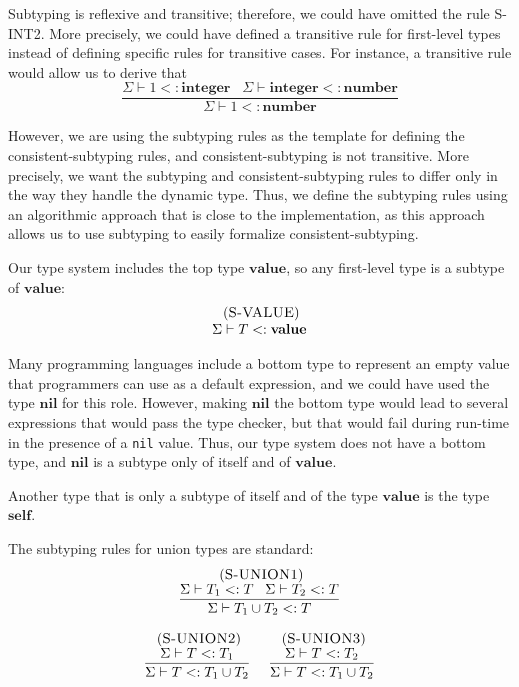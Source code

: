 \documentclass{sigplanconf}
\newcommand{\Value}{\mathbf{value}}
\newcommand{\Nil}{\mathbf{nil}}
\newcommand{\Self}{\mathbf{self}}
\newcommand{\Integer}{\mathbf{integer}}
\newcommand{\Number}{\mathbf{number}}
\newcommand{\mylabel}[1]{\; (\textsc{#1})}
\newcommand{\senv}{\Sigma}
\newcommand{\subtype}{<:}
\begin{document}
Subtyping is reflexive and transitive;
therefore, we could have omitted the rule \textsc{S-INT2}.
More precisely, we could have defined a transitive rule for first-level
types instead of defining specific rules for transitive cases.
For instance, a transitive rule would allow us to derive that
\[
\dfrac{\senv \vdash 1 \subtype \Integer \;\;\;
       \senv \vdash \Integer \subtype \Number}
      {\senv \vdash 1 \subtype \Number}
\]

However, we are using the subtyping rules as the template for defining
the consistent-subtyping rules, and consistent-subtyping is not
transitive.
More precisely, we want the subtyping and consistent-subtyping rules
to differ only in the way they handle the dynamic type.
Thus, we define the subtyping rules using an algorithmic approach
that is close to the implementation, as this approach allows us to use
subtyping to easily formalize consistent-subtyping.

Our type system includes the top type $\Value$,
so any first-level type is a subtype of $\Value$:
\[
\begin{array}{c}
\mylabel{S-VALUE}\\
\senv \vdash T \subtype \Value
\end{array}
\]

Many programming languages include a bottom type to represent
an empty value that programmers can use as a default expression,
and we could have used the type $\Nil$ for this role.
However, making $\Nil$ the bottom type would lead to several expressions
that would pass the type checker, but that would fail during run-time
in the presence of a \texttt{nil} value.
Thus, our type system does not have a bottom type, and $\Nil$ is a
subtype only of itself and of $\Value$.

Another type that is only a subtype of itself and of the type $\Value$
is the type $\Self$.

The subtyping rules for union types are standard:
\[
\begin{array}{c}
\begin{array}{c}
\mylabel{S-UNION1}\\
\dfrac{\senv \vdash T_{1} \subtype T \;\;\;
       \senv \vdash T_{2} \subtype T}
      {\senv \vdash T_{1} \cup T_{2} \subtype T}
\end{array}
\\ \\
\begin{array}{c}
\mylabel{S-UNION2}\\
\dfrac{\senv \vdash T \subtype T_{1}}
      {\senv \vdash T \subtype T_{1} \cup T_{2}}
\end{array}
\;
\begin{array}{c}
\mylabel{S-UNION3}\\
\dfrac{\senv \vdash T \subtype T_{2}}
      {\senv \vdash T \subtype T_{1} \cup T_{2}}
\end{array}
\end{array}
\]
\end{document}
